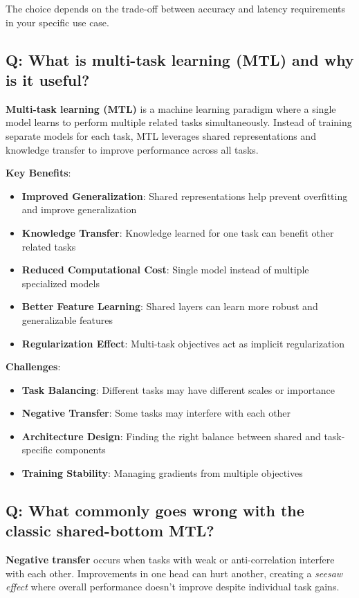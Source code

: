 The choice depends on the trade-off between accuracy and latency requirements in your specific use case.

\subsection*{Q: What is multi-task learning (MTL) and why is it useful?}
\textbf{Multi-task learning (MTL)} is a machine learning paradigm where a single model learns to perform multiple related tasks simultaneously. Instead of training separate models for each task, MTL leverages shared representations and knowledge transfer to improve performance across all tasks.

\textbf{Key Benefits}:
\begin{itemize}
	\item \textbf{Improved Generalization}: Shared representations help prevent overfitting and improve generalization
	\item \textbf{Knowledge Transfer}: Knowledge learned for one task can benefit other related tasks
	\item \textbf{Reduced Computational Cost}: Single model instead of multiple specialized models
	\item \textbf{Better Feature Learning}: Shared layers can learn more robust and generalizable features
	\item \textbf{Regularization Effect}: Multi-task objectives act as implicit regularization
\end{itemize}

\textbf{Challenges}:
\begin{itemize}
	\item \textbf{Task Balancing}: Different tasks may have different scales or importance
	\item \textbf{Negative Transfer}: Some tasks may interfere with each other
	\item \textbf{Architecture Design}: Finding the right balance between shared and task-specific components
	\item \textbf{Training Stability}: Managing gradients from multiple objectives
\end{itemize}

\subsection*{Q: What commonly goes wrong with the classic shared-bottom MTL?}
\textbf{Negative transfer} occurs when tasks with weak or anti-correlation interfere with each other. Improvements in one head can hurt another, creating a \emph{seesaw effect} where overall performance doesn't improve despite individual task gains.

